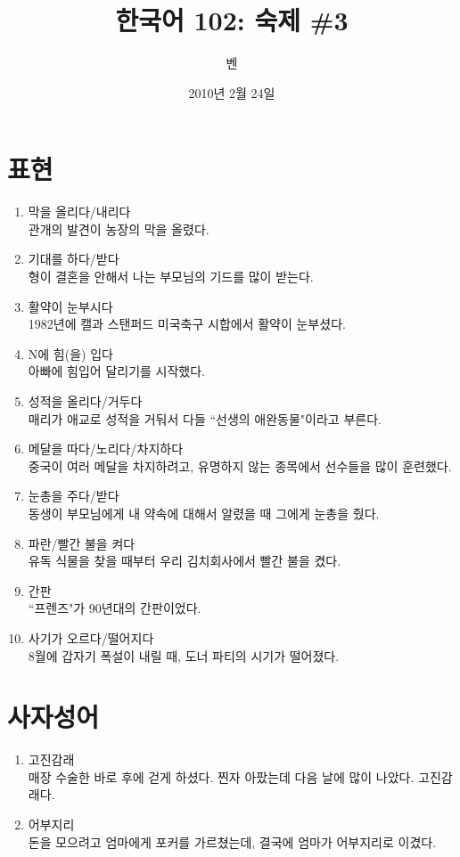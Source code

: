 \documentclass[11pt]{article}
\title{한국어 102: 숙제 \#3}
\author{벤}
\date{2010년 2월 24일}
\begin{document}
\maketitle
\thispagestyle{empty}
\pagestyle{empty}

\section{표현}
\begin{enumerate}
  \item 막을 올리다/내리다 \\
    관개의 발견이 농장의 막을 올렸다.
  \item 기대를 하다/받다 \\
    형이 결혼을 안해서 나는 부모님의 기드를 많이 받는다.
  \item 활약이 눈부시다 \\
    1982년에 캘과 스탠퍼드 미국축구 시합에서 활약이 눈부셨다. 
  \item N에 힘(을) 입다 \\
    아빠에 힘입어 달리기를 시작했다.
  \item 성적을 올리다/거두다 \\
    매리가 애교로 성적을 거둬서 다들 ``선생의 애완동물"이라고 부른다.
  \item 메달을 따다/노리다/차지하다 \\
    중국이 여러 메달을 차지하려고, 유명하지 않는 종목에서 선수들을 많이 훈련했다.
  \item 눈총을 주다/받다 \\
    동생이 부모님에게 내 약속에 대해서 알렸을 때 그에게 눈총을 줬다.
  \item 파란/빨간 불을 켜다 \\
    유독 식물을 찾을 때부터 우리 김치회사에서 빨간 불을 켰다.
  \item 간판 \\
    ``프렌즈"가 90년대의 간판이었다.
  \item 사기가 오르다/떨어지다 \\
    8월에 갑자기 폭설이 내릴 때, 도너 파티의 시기가 떨어졌다.
\end{enumerate}

\section{사자성어}
\begin{enumerate}
  \item 고진감래 \\
    매장 수술한 바로 후에 걷게 하셨다. 찐자 아팠는데 다음 날에 많이 나았다. 고진감래다.
  \item 어부지리 \\
    돈을 모으려고 엄마에게 포커를 가르쳤는데, 결국에 엄마가 어부지리로 이겼다.
\end{enumerate}
\end{document}
